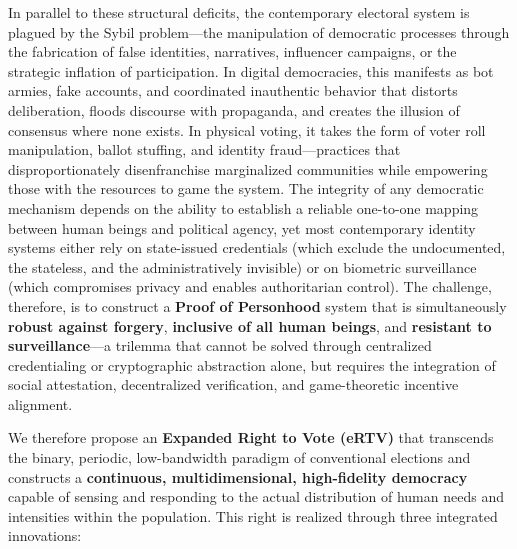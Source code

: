 In parallel to these structural deficits, the contemporary electoral
system is plagued by the Sybil problem---the manipulation of democratic
processes through the fabrication of false identities, narratives,
influencer campaigns, or the strategic inflation of participation. In
digital democracies, this manifests as bot armies, fake accounts, and
coordinated inauthentic behavior that distorts deliberation, floods
discourse with propaganda, and creates the illusion of consensus where
none exists. In physical voting, it takes the form of voter roll
manipulation, ballot stuffing, and identity fraud---practices that
disproportionately disenfranchise marginalized communities while
empowering those with the resources to game the system. The integrity of
any democratic mechanism depends on the ability to establish a reliable
one-to-one mapping between human beings and political agency, yet most
contemporary identity systems either rely on state-issued credentials
(which exclude the undocumented, the stateless, and the administratively
invisible) or on biometric surveillance (which compromises privacy and
enables authoritarian control). The challenge, therefore, is to
construct a \textbf{Proof of Personhood} system that is simultaneously
\textbf{robust against forgery}, \textbf{inclusive of all human beings},
and \textbf{resistant to surveillance}---a trilemma that cannot be
solved through centralized credentialing or cryptographic abstraction
alone, but requires the integration of social attestation, decentralized
verification, and game-theoretic incentive alignment.

We therefore propose an \textbf{Expanded Right to Vote (eRTV)} that
transcends the binary, periodic, low-bandwidth paradigm of conventional
elections and constructs a \textbf{continuous, multidimensional,
high-fidelity democracy} capable of sensing and responding to the actual
distribution of human needs and intensities within the population. This
right is realized through three integrated innovations:

